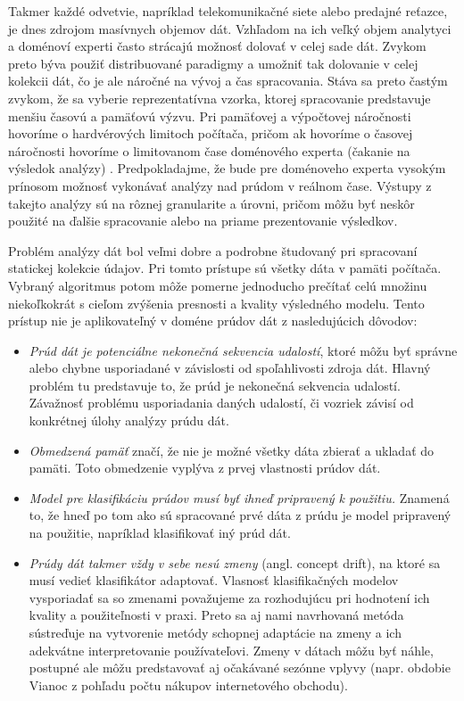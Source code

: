 Takmer každé odvetvie, napríklad telekomunikačné siete alebo predajné reťazce, je dnes zdrojom masívnych objemov dát. Vzhľadom na ich veľký objem analytyci a doménoví experti často strácajú možnosť dolovať v celej sade dát. Zvykom preto býva použiť distribuované paradigmy a umožniť tak dolovanie v celej kolekcii dát, čo je ale náročné na vývoj a čas spracovania. Stáva sa preto častým zvykom, že sa vyberie reprezentatívna vzorka, ktorej spracovanie predstavuje menšiu časovú a pamäťovú výzvu. Pri pamäťovej a výpočtovej náročnosti hovoríme o hardvérových limitoch počítača, pričom ak hovoríme o časovej náročnosti hovoríme o limitovanom čase doménového experta (čakanie na výsledok analýzy) \citep{hulten2001mining}. Predpokladajme, že bude pre doménoveho experta vysokým prínosom možnosť vykonávať analýzy nad prúdom v reálnom čase. Výstupy z takejto analýzy sú na rôznej granularite a úrovni, pričom môžu byť neskôr použité na ďalšie spracovanie alebo na priame prezentovanie výsledkov.
\par
Problém analýzy dát bol veľmi dobre a podrobne študovaný pri spracovaní statickej kolekcie údajov. Pri tomto prístupe sú všetky dáta v pamäti počítača. Vybraný algoritmus potom môže pomerne jednoducho prečítať celú množinu niekoľkokrát s cieľom zvýšenia presnosti a kvality výsledného modelu. Tento prístup nie je aplikovateľný v doméne prúdov dát z nasledujúcich dôvodov:
\begin{itemize}
	\item \textit{Prúd dát je potenciálne nekonečná sekvencia udalostí}, ktoré môžu byť správne alebo chybne usporiadané v závislosti od spoľahlivosti zdroja dát. Hlavný problém tu predstavuje to, že prúd je nekonečná sekvencia udalostí. Závažnosť problému usporiadania daných udalostí, či vozriek závisí od konkrétnej úlohy analýzy prúdu dát.
	\item \textit{Obmedzená pamäť} značí, že nie je možné všetky dáta zbierať a ukladať do pamäti. Toto obmedzenie vyplýva z prvej vlastnosti prúdov dát.
	\item \textit{Model pre klasifikáciu prúdov musí byť ihneď pripravený k použitiu.} Znamená to, že hneď po tom ako sú spracované prvé dáta z prúdu je model pripravený na použitie, napríklad klasifikovať iný prúd dát.
	\item \textit{Prúdy dát takmer vždy v sebe nesú zmeny} (angl. concept drift), na ktoré sa musí vedieť klasifikátor adaptovať. Vlasnosť klasifikačných modelov vysporiadať sa so zmenami považujeme za rozhodujúcu pri hodnotení ich kvality a použiteľnosti v praxi. Preto sa aj nami navrhovaná metóda sústreďuje na vytvorenie metódy schopnej adaptácie na zmeny a ich adekvátne interpretovanie používateľovi. Zmeny v dátach môžu byť náhle, postupné ale môžu predstavovať aj očakávané sezónne vplyvy (napr. obdobie Vianoc z pohľadu počtu nákupov internetového obchodu).
\end{itemize}

